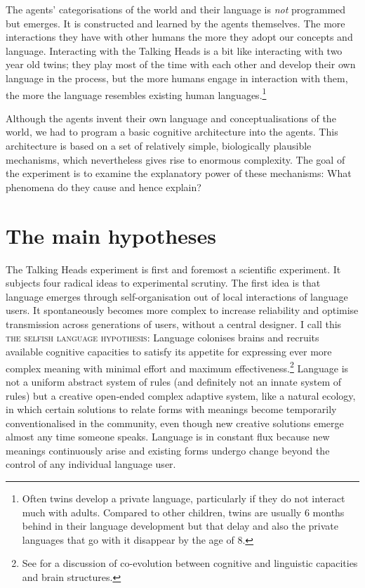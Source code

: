 The agents' categorisations of
the world and their language is {\itshape not} programmed but
emerges. It is 
constructed and learned by the agents themselves. The more 
interactions they have with other humans the more they 
adopt our concepts and language. Interacting with the Talking 
Heads is a bit like interacting with two year old 
twins; they play  most of the time with each other and
develop their own language in the process, but the more
humans engage in interaction with them, the more the language
resembles existing human languages.\footnote{Often twins develop a private language, particularly 
if they do not interact much with adults. Compared
to other children, twins are usually 6 months behind 
in their language development but that delay and 
also the private languages that go with it disappear
by the age of 8.}

Although the agents invent their own 
language and conceptualisations of the world, we
had to program a basic cognitive architecture into 
the agents. This architecture is based on a set of relatively
simple, biologically plausible mechanisms, which 
nevertheless gives rise to enormous complexity.
The goal of the experiment is to examine the explanatory power of 
these mechanisms: What phenomena do they cause and
hence explain? 

\section{The main hypotheses}

The Talking Heads experiment is first and foremost
a scientific experiment. It subjects four radical ideas 
to experimental scrutiny. 
The first idea is that 
language emerges through self-organisation out of local
interactions of language users. It spontaneously 
becomes more complex to increase
reliability and optimise transmission across generations of 
users, without a central designer.
I call this {\scshape the selfish
language hypothesis}: Language colonises
brains and recruits available cognitive capacities to satisfy
its appetite for expressing ever more complex meaning with
minimal effort and maximum 
effectiveness.\footnote{
See \cite{Deacon:1998} for a discussion of 
co-evolution between cognitive and linguistic
capacities and brain structures.}
Language is 
not a uniform abstract system of rules (and definitely not an 
innate system of rules) but a creative open-ended complex
adaptive system, like a natural
ecology, in which certain solutions to relate forms with 
meanings become temporarily conventionalised in 
the community, even though new creative solutions
emerge almost any time someone speaks. Language
is in constant flux because new meanings continuously
arise and existing forms undergo change beyond the 
control of any individual language user. 

